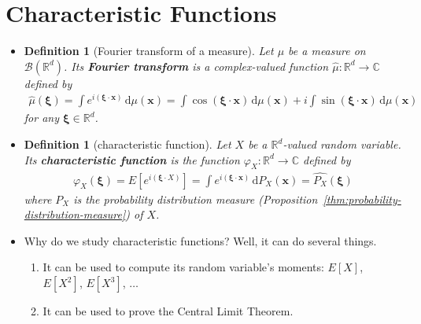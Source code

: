 \documentclass[10pt]{article}
\newtheorem{definition}[lemma]{Definition}
\numberwithin{lemma}{section}
\newcommand{\dee}{\mathrm{d}}
\newcommand{\ve}[1]{\mathbf{#1}}
\newcommand{\ves}[1]{\boldsymbol{#1}}
\newcommand{\mcal}[1]{\mathcal{#1}}
\newcommand{\Real}{\mathbb{R}}
\begin{document}
\section{Characteristic Functions}

\begin{itemize}
  \item \begin{definition}[Fourier transform of a measure]
    Let $\mu$ be a measure on $\mcal{B}(\Real^d)$. Its {\bf Fourier transform} is a complex-valued function $\hat{\mu}: \Real^d \rightarrow \mathbb{C}$ defined by
    \begin{align*}
      \hat\mu(\ves{\xi}) 
      = \int e^{i(\ves{\xi} \cdot \ve{x})}\, \dee\mu(\ve{x})
      = \int \cos(\ves{\xi} \cdot \ve{x})\, \dee\mu(\ve{x})
      + i \int \sin(\ves{\xi} \cdot \ve{x})\, \dee\mu(\ve{x})
    \end{align*}
    for any $\ves{\xi} \in \Real^d$.
  \end{definition}

  \item \begin{definition}[characteristic function]
    Let $X$ be a $\Real^d$-valued random variable. Its {\bf characteristic function} is the function $\varphi_X: \Real^d \rightarrow \mathbb{C}$ defined by
    \begin{align*}
      \varphi_X(\ves{\xi}) = E[e^{i(\ves{\xi} \cdot X)}] = \int e^{i(\ves{\xi} \cdot \ve{x})}\, \dee P_X(\ve{x})
      = \widehat{P_X}(\ves{\xi})
    \end{align*}
    where $P_X$ is the probability distribution measure (Proposition~\ref{thm:probability-distribution-measure}) of $X$.
  \end{definition}

  \item Why do we study characteristic functions? Well, it can do several things.
  \begin{enumerate}
    \item It can be used to compute its random variable's moments: $E[X]$, $E[X^2]$, $E[X^3]$, $\dotsc$
    \item It can be used to prove the Central Limit Theorem.
  \end{enumerate}


\end{itemize}
\end{document}
